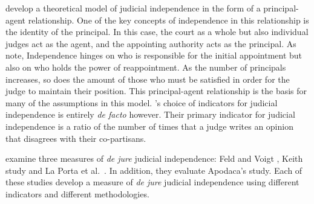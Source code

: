 \documentclass[12pt]{article}
\begin{document}
\citet*{Choi2010} develop a theoretical model of judicial independence in the form of a principal-agent relationship.  One of the key concepts of independence in this relationship is the identity of the principal.  In this case, the court as a whole but also individual judges act as the agent, and the appointing authority acts as the principal.  As \citeauthor{Choi2010} note, Independence hinges on who is responsible for the initial appointment but also on who holds the power of reappointment.  As the number of principals increases, so does the amount of those who must be satisfied in order for the judge to maintain their position.  This principal-agent relationship is the basis for many of the assumptions in this model.  \citet{Choi2010}'s choice of indicators for judicial independence is entirely \textit{de facto} however.  Their primary indicator for judicial independence is a ratio of the number of times that a judge writes an opinion that disagrees with their co-partisans.

\citet{Rios2014} examine three measures of \textit{de jure} judicial independence: Feld and Voigt \citeyearpar{Feld2003}, Keith \citeyearpar{Keith2002a} study and La Porta et al.\ \citeyearpar{Laporta2004}.  In addition, they evaluate Apodaca's \citeyearpar{Apodaca2004} study.  Each of these studies develop a measure of \textit{de jure} judicial independence using different indicators and different methodologies.
\end{document}
